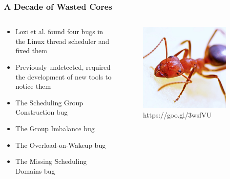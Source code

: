 \documentclass{beamer}
\newcommand{\linespace}{\vskip 0.25cm}
\begin{document}
\begin{frame}
\frametitle{A Decade of Wasted Cores}

\begin{columns}
\begin{column}{0.72\textwidth}
\begin{itemize}
	\item Lozi et al. found four bugs in the Linux thread scheduler and fixed them~\cite{Lozi:2016}

\linespace

\item Previously undetected, required the development of new tools to notice them

\linespace

	\item The Scheduling Group Construction bug
	\item The Group Imbalance bug
	\item The Overload-on-Wakeup bug
	\item The Missing Scheduling Domains bug
\end{itemize}
\end{column}
\begin{column}[b]{0.28\textwidth} %
\begin{figure}
\centering
\includegraphics[width=0.95\textwidth]{Illustrations/ant_from_pexels.png}
\caption*{https://goo.gl/3wsfVU}
\end{figure}
\end{column}
\end{columns}
\end{frame}
\end{document}
